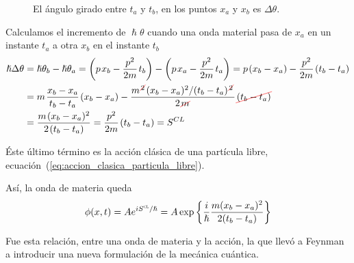\begin{figure}[ht]
\begin{minipage}{0.3\linewidth}
  \caption{El ángulo girado entre $t_a$ y $t_b$, en los puntos $x_a$ y
    $x_b$ es $\Delta\theta$.}
\end{minipage}
\end{figure}

Calculamos el incremento de $\hslash\theta$ cuando una onda material
pasa de $x_a$ en un instante $t_a$ a otra $x_b$ en el instante $t_b$
\begin{align*}
  \hslash\Delta\theta
  &=
  \hslash\theta_b - \hslash\theta_a
  =
  \left(p\kern1pt x_b-\dfrac{p^2}{2m}\kern1pt t_b\right)
  -
  \left(p\kern1pt x_a-\dfrac{p^2}{2m}\kern1pt t_a\right)
  =
    p\kern1pt (x_b-x_a)-\dfrac{p^2}{2m}\kern1pt (t_b-t_a)\\
  &=
    m\kern1pt\dfrac{x_b-x_a}{t_b-t_a}\kern1pt (x_b-x_a)
    -
    \dfrac{m^{\cancelout{\scriptstyle 2}}(x_b-x_a)^2/(t_b-t_a)^{\cancelout{\scriptstyle 2}}}{2\cancelout{m}}
    \cancelout{(t_b-t_a)}\\
  &=
    \dfrac{m\kern1pt(x_b-x_a)^2}{2\kern1pt(t_b-t_a)}
    =
    \dfrac{p^2}{2m}\kern1pt (t_b-t_a)
    = S^{CL}
\end{align*}

Éste último término es la acción clásica de una partícula libre,
ecuación~(\ref{eq:accion_clasica_particula_libre}).

Así, la onda de materia queda
\[
  \phi (x,t) = A e^{i S^{\textsc{cl}}/\hslash}
  = A\exp\left\{\dfrac{i}{\hslash}\dfrac{m(x_b-x_a)^2}{2(t_b-t_a)}\right\}
\]

Fue esta relación, entre una onda de materia y la acción, la que llevó
a Feynman a introducir una nueva formulación de la mecánica cuántica.

